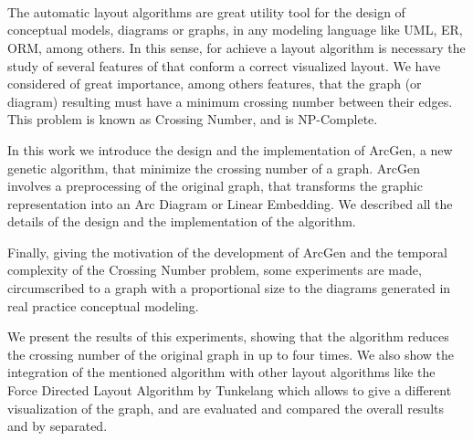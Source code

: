\ \\
\ \\
\label{pagsumm}
\\
\ \\
\ \\

\ \\

\ \\
\ \\
The automatic layout algorithms are great utility tool for the design of conceptual models, diagrams or graphs, in any modeling language like UML, ER, ORM, among others. In this sense, for achieve a layout algorithm is necessary the study of several features of that conform a correct visualized layout. We have considered of great importance, among others features, that the graph (or diagram) resulting must have a minimum crossing number between their edges. This problem is known as Crossing Number, and is NP-Complete. 

In this work we introduce the design and the implementation of {\sc ArcGen}, a new genetic algorithm, that minimize the crossing number of a graph. {\sc ArcGen} involves a preprocessing of the original graph, that transforms the graphic representation into an Arc Diagram or Linear Embedding. We described all the details of the design and the implementation of the algorithm. 

Finally, giving the motivation of the development of {\sc ArcGen} and the temporal complexity of the Crossing Number problem, some experiments are made, circumscribed to a graph with a proportional size to the diagrams generated in real practice conceptual modeling. 

We present the results of this experiments, showing that the algorithm reduces the crossing number of the original graph in up to four times. We also show the integration of the mentioned algorithm with other layout algorithms like the Force Directed Layout Algorithm by Tunkelang which allows to give a different visualization of the graph, and are evaluated and compared the overall results and by separated.

\vfill
\pagebreak
